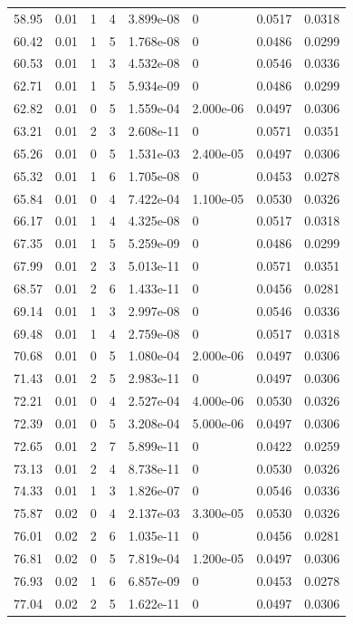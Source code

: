 \documentclass[preview]{standalone}
\begin{document}
{{{\begin{tabular}{L{1.2cm}C{1.2cm} C{0.3cm}C{0.5cm} C{1.4cm}C{1.4cm} C{1.4cm}C{1.4cm}}
  58.95  &  0.01  & 1     &  4 &  3.899e-08  & 0  & 0.0517 &  0.0318   \\ 
  60.42  &  0.01  & 1     &  5 &  1.768e-08  & 0  & 0.0486 &  0.0299   \\ 
  60.53  &  0.01  & 1     &  3 &  4.532e-08  & 0  & 0.0546 &  0.0336   \\ 
  62.71  &  0.01  & 1     &  5 &  5.934e-09  & 0  & 0.0486 &  0.0299   \\ 
  62.82  &  0.01  & 0     &  5 &  1.559e-04  & 2.000e-06  & 0.0497 &  0.0306   \\ 
  63.21  &  0.01  & 2     &  3 &  2.608e-11  & 0  & 0.0571 &  0.0351   \\ 
  65.26  &  0.01  & 0     &  5 &  1.531e-03  & 2.400e-05  & 0.0497 &  0.0306   \\ 
  65.32  &  0.01  & 1     &  6 &  1.705e-08  & 0  & 0.0453 &  0.0278   \\ 
  65.84  &  0.01  & 0     &  4 &  7.422e-04  & 1.100e-05  & 0.0530 &  0.0326   \\ 
  66.17  &  0.01  & 1     &  4 &  4.325e-08  & 0  & 0.0517 &  0.0318   \\ 
  67.35  &  0.01  & 1     &  5 &  5.259e-09  & 0  & 0.0486 &  0.0299   \\ 
  67.99  &  0.01  & 2     &  3 &  5.013e-11  & 0  & 0.0571 &  0.0351   \\ 
  68.57  &  0.01  & 2     &  6 &  1.433e-11  & 0  & 0.0456 &  0.0281   \\ 
  69.14  &  0.01  & 1     &  3 &  2.997e-08  & 0  & 0.0546 &  0.0336   \\ 
  69.48  &  0.01  & 1     &  4 &  2.759e-08  & 0  & 0.0517 &  0.0318   \\ 
  70.68  &  0.01  & 0     &  5 &  1.080e-04  & 2.000e-06  & 0.0497 &  0.0306   \\ 
  71.43  &  0.01  & 2     &  5 &  2.983e-11  & 0  & 0.0497 &  0.0306   \\ 
  72.21  &  0.01  & 0     &  4 &  2.527e-04  & 4.000e-06  & 0.0530 &  0.0326   \\ 
  72.39  &  0.01  & 0     &  5 &  3.208e-04  & 5.000e-06  & 0.0497 &  0.0306   \\ 
  72.65  &  0.01  & 2     &  7 &  5.899e-11  & 0  & 0.0422 &  0.0259   \\ 
  73.13  &  0.01  & 2     &  4 &  8.738e-11  & 0  & 0.0530 &  0.0326   \\ 
  74.33  &  0.01  & 1     &  3 &  1.826e-07  & 0  & 0.0546 &  0.0336   \\ 
  75.87  &  0.02  & 0     &  4 &  2.137e-03  & 3.300e-05  & 0.0530 &  0.0326   \\ 
  76.01  &  0.02  & 2     &  6 &  1.035e-11  & 0  & 0.0456 &  0.0281   \\ 
  76.81  &  0.02  & 0     &  5 &  7.819e-04  & 1.200e-05  & 0.0497 &  0.0306   \\ 
  76.93  &  0.02  & 1     &  6 &  6.857e-09  & 0  & 0.0453 &  0.0278   \\ 
  77.04  &  0.02  & 2     &  5 &  1.622e-11  & 0  & 0.0497 &  0.0306   \\ 
\hline 
\end{tabular} 

}}}
\end{document}
